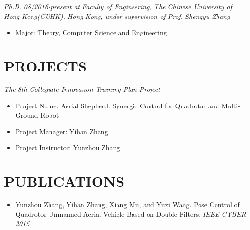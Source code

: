 \documentclass[margin, 10pt]{res} %
\begin{document}
\begin{resume}
{\sl Ph.D. 08/2016-present at Faculty of Engineering, The Chinese University of Hong Kong(CUHK), Hong Kong, under supervision of Prof. Shengyu Zhang} \\
\begin{itemize}
\item Major: Theory, Computer Science and Engineering
\end{itemize}

\section{PROJECTS}
{\sl The 8th Collegiate Innovation Training Plan Project} \\
\begin{itemize}
\item Project Name: Aerial Shepherd: Synergic Control for Quadrotor and Multi-Ground-Robot
\item Project Manager: Yihan Zhang
\item Project Instructor: Yunzhou Zhang
\end{itemize}

\section{PUBLICATIONS}
\begin{itemize}
\item Yunzhou Zhang, Yihan Zhang, Xiang Mu, and Yuxi Wang. Pose Control of Quadrotor Unmanned Aerial Vehicle Based on Double Filters. {\sl IEEE-CYBER 2015} 
\end{itemize}


\end{resume}
\end{document}

